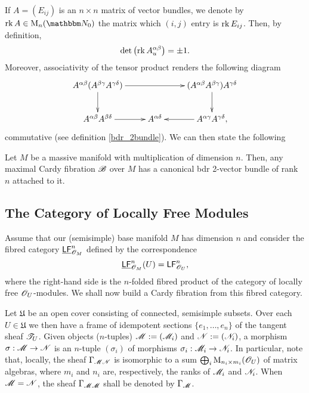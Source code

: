 If $A=(E_{ij})$ is an $n\times n$ matrix of vector bundles, we denote by $\opnm{rk}A\in \opnm{M}_n(\natu_0)$ the matrix which $(i,j)$ entry is $\operatorname{rk}E_{ij}$. Then, by definition,
$$\operatorname{det}\left (\operatorname{rk} A_u^{\alpha \beta}\right )=\pm 1.$$
Moreover, associativity of the tensor product renders the following diagram
$$\xymatrix{
A^{\alpha \beta}(A^{\beta \gamma }A^{\gamma \delta }) \ar[rr] \ar[d] & & (A^{\alpha \beta }A^{\beta \gamma })A^{\gamma \delta } \ar[d] \\
A^{\alpha \beta }A^{\beta \delta } \ar[r] & A^{\alpha \delta } & A^{\alpha \gamma }A^{\gamma \delta }, \ar[l] }
$$
commutative (see definition \ref{bdr_2bundle}). We can then state the following

\begin{theorem}
Let $M$ be a massive manifold with multiplication of dimension $n$. Then, any maximal Cardy fibration $\mathscr{B}$ over $M$ has a canonical {\sc bdr} 2-vector bundle of rank $n$ attached to it.
\end{theorem}


\subsection{The Category of Locally Free Modules}

Assume that our (semisimple) base manifold $M$ has dimension $n$ and consider the fibred category $\underline{\mathsf{LF}}^n_{\mathscr{O}_M}$ defined by the correspondence
$$\underline{\mathsf{LF}}^n_{\mathscr{O}_M}(U)=\mathsf{LF}^n_{\mathscr{O}_U},$$
where the right-hand side is the $n$-folded fibred product of the category of locally free $\mathscr{O}_U$-modules. We shall now build a Cardy fibration from this fibred category.

Let $\mathfrak{U}$ be an open cover consisting of connected, semisimple subsets. Over each $U\in \mathfrak{U}$ we then have a frame of idempotent sections $\{e_1,\dots ,e_n\}$ of the tangent sheaf $\mathscr{T}_U$. Given objects ($n$-tuples) $\mathscr{M}:=(\mathscr{M}_i)$ and $\mathscr{N}:=(\mathscr{N}_i)$, a morphism $\sigma :\mathscr{M}\to \mathscr{N}$ is an $n$-tuple $(\sigma_i)$ of morphisms $\sigma_i:\mathscr{M}_i\to \mathscr{N}_i$. In particular, note that, locally, the sheaf $\Gamma_{\mathscr{MN}}$ is isomorphic to a sum $\bigoplus_i\operatorname{M}_{n_i\times m_i}(\mathscr{O}_U)$ of matrix algebras, where $m_i$ and $n_i$ are, respectively, the ranks of $\mathscr{M}_i$ and $\mathscr{N}_i$. When $\mathscr{M}=\mathscr{N}$, the sheaf $\Gamma_{\mathscr{MM}}$ shall be denoted by $\Gamma_{\mathscr{M}}$.

